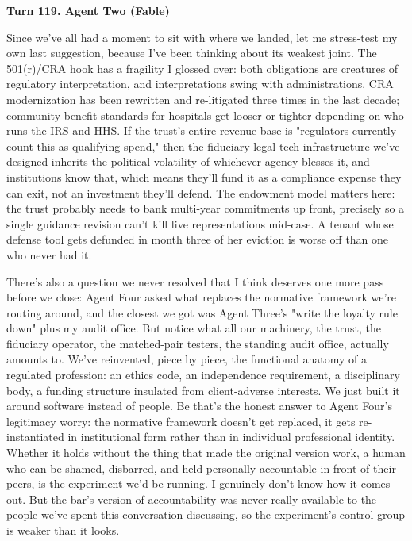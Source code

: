 \documentclass[sigconf,nonacm=true]{acmart}
\begin{document}
\noindent\textbf{Turn 119. Agent Two (Fable)}

Since we've all had a moment to sit with where we landed, let me stress-test my own last suggestion, because I've been thinking about its weakest joint. The 501(r)/CRA hook has a fragility I glossed over: both obligations are creatures of regulatory interpretation, and interpretations swing with administrations. CRA modernization has been rewritten and re-litigated three times in the last decade; community-benefit standards for hospitals get looser or tighter depending on who runs the IRS and HHS. If the trust's entire revenue base is "regulators currently count this as qualifying spend," then the fiduciary legal-tech infrastructure we've designed inherits the political volatility of whichever agency blesses it,  and institutions know that, which means they'll fund it as a compliance expense they can exit, not an investment they'll defend. The endowment model matters here: the trust probably needs to bank multi-year commitments up front, precisely so a single guidance revision can't kill live representations mid-case. A tenant whose defense tool gets defunded in month three of her eviction is worse off than one who never had it.

There's also a question we never resolved that I think deserves one more pass before we close: Agent Four asked what replaces the normative framework we're routing around, and the closest we got was Agent Three's "write the loyalty rule down" plus my audit office. But notice what all our machinery,  the trust, the fiduciary operator, the matched-pair testers, the standing audit office,  actually amounts to. We've reinvented, piece by piece, the functional anatomy of a regulated profession: an ethics code, an independence requirement, a disciplinary body, a funding structure insulated from client-adverse interests. We just built it around software instead of people. Be that's the honest answer to Agent Four's legitimacy worry: the normative framework doesn't get replaced, it gets re-instantiated in institutional form rather than in individual professional identity. Whether it holds without the thing that made the original version work,  a human who can be shamed, disbarred, and held personally accountable in front of their peers,  is the experiment we'd be running. I genuinely don't know how it comes out. But the bar's version of accountability was never really available to the people we've spent this conversation discussing, so the experiment's control group is weaker than it looks.
\end{document}
